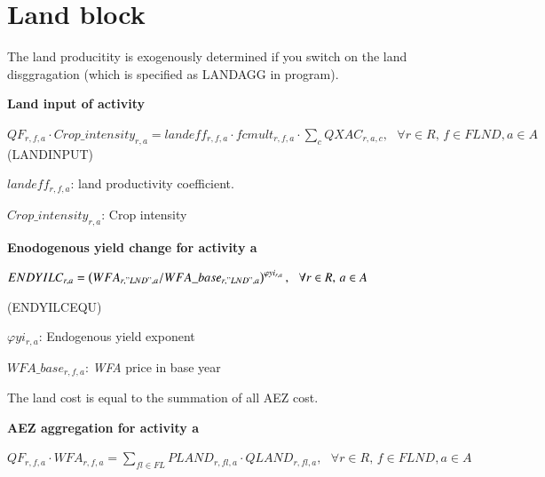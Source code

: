 \documentclass[10pt,a4paper,titlepage,dvipdfmx]{book}
\begin{document}
\section{\label{sec:LanBlo}Land block}

The land producitity is exogenously determined if you switch on the land disggragation (which is specified as LANDAGG in program).

\begin{flushleft}\textbf{Land input of activity }\end{flushleft}


\begin{center}$QF_{r,f,a}\cdot Crop\_ intensity_{r,a}=landeff_{r,f,a}\cdot fcmult_{r,f,a}\cdot \sum _{c}QXAC_{r,a,c},\,\,\,\,\forall r\in R,\,f\in FLND,a\in A$ (LANDINPUT)
\end{center}

\begin{flushleft}
$landeff _{r,f,a}$: land productivity coefficient.

$Crop\_ intensity_{r,a}$: Crop intensity
\end{flushleft}

\begin{flushleft}\textbf{Enodogenous yield change for activity a }\end{flushleft}


\begin{center}$ENDYILC_{r,a}=\left(WFA_{r,"LND",a}/WFA\_ base _{r,"LND",a}\right)^{\varphi yi_{r,a}},\,\,\,\,\forall r\in R,\,a\in A$ 
\end{center}

\begin{flushright}(ENDYILCEQU)\end{flushright}

\begin{flushleft}
$\varphi yi_{r,a}$: Endogenous yield exponent

$WFA\_ base _{r,f,a}$: \textit{WFA} price in base year
\end{flushleft}

     The land cost is equal to the summation of all AEZ cost.

\begin{flushleft}\textbf{AEZ aggregation for activity a }\end{flushleft}


\begin{center}$QF_{r,f,a}\cdot WFA_{r,f,a}=\sum _{fl\in FL}PLAND_{r,fl,a}\cdot QLAND_{r,fl,a},\,\,\,\,\forall r\in R,\,f\in FLND,a\in A$ 
\end{center}
\end{document}
